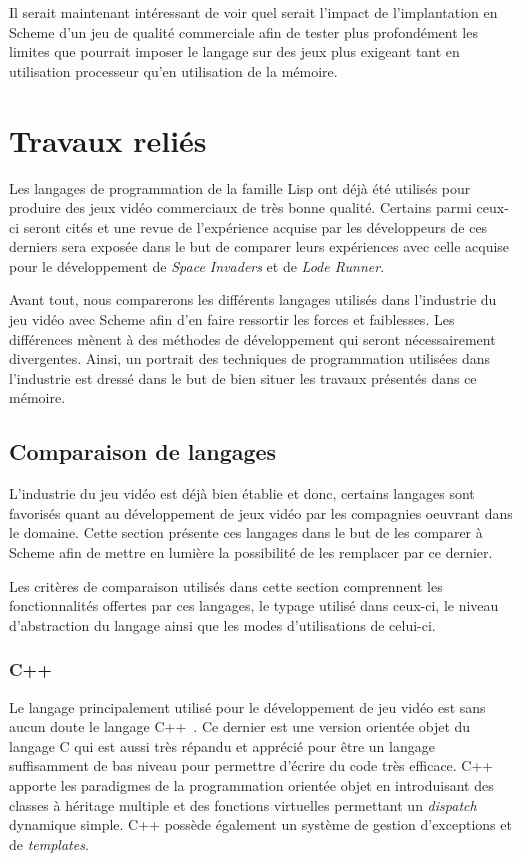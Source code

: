 \documentclass[12pt,twoside,letterpaper,francais]{book}
\begin{document}
Il serait maintenant intéressant de voir quel serait l'impact de
l'implantation en Scheme d'un jeu de qualité commerciale afin de
tester plus profondément les limites que pourrait imposer le langage
sur des jeux plus exigeant tant en utilisation processeur qu'en
utilisation de la mémoire.





\clearpage

\chapter{Travaux reliés}
Les langages de programmation de la famille Lisp ont déjà été
utilisés pour produire des jeux vidéo commerciaux de très bonne
qualité. Certains parmi ceux-ci seront cités et une revue de
l'expérience acquise par les développeurs de ces derniers sera exposée
dans le but de comparer leurs expériences avec celle acquise pour le
dévelop\-pement de \textit{Space Invaders} et de \textit{Lode Runner}.

Avant tout, nous comparerons les différents langages utilisés dans
l'industrie du jeu vidéo avec Scheme afin d'en faire ressortir les
forces et faiblesses. Les différences mènent à des méthodes de
dévelop\-pement qui seront nécessairement divergentes. Ainsi, un
portrait des techniques de programmation utilisées dans l'industrie
est dressé dans le but de bien situer les travaux présentés dans ce
mémoire.


\FloatBarrier
\section{Comparaison de langages}
L'industrie du jeu vidéo est déjà bien établie et donc, certains
langages sont favorisés quant au dévelop\-pement de jeux vidéo par les
compagnies oeuvrant dans le domaine. Cette section présente ces
langages dans le but de les comparer à Scheme afin de mettre en
lumière la possibilité de les remplacer par ce dernier.

Les critères de comparaison utilisés dans cette section comprennent
les fonctionnalités offertes par ces langages, le typage utilisé dans
ceux-ci, le niveau d'abstraction du langage ainsi que les modes
d'utilisations de celui-ci. 


\FloatBarrier
\subsection{C++}
Le langage principalement utilisé pour le dévelop\-pement de jeu vidéo
est sans aucun doute le langage C++~\cite{cplusplus}. Ce dernier est
une version orientée objet du langage C\cite{Ritchie-C-dev} qui est
aussi très répandu et apprécié pour être un langage suffisamment de
bas niveau pour permettre d'écrire du code très efficace. C++ apporte
les paradigmes de la programmation orientée objet en introduisant des
classes à héritage multiple et des fonctions virtuelles permettant un
\textit{dispatch} dynamique simple. C++ possède également un système
de gestion d'exceptions et de \textit{templates}.
\end{document}

